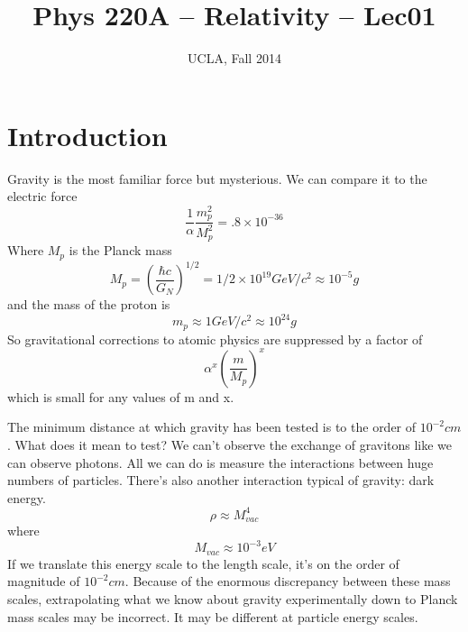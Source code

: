
\usepackage[margin=1in]{geometry} %





\title{Phys 220A -- Relativity -- Lec01}
\author{UCLA, Fall 2014}
\date{} %


\setlength{\unitlength}{1mm}
\maketitle

\section{Introduction}
Gravity is the most familiar force but mysterious. We can compare it to the electric force
\begin{equation}
\frac{1}{\alpha} \frac{m_p^2}{M_p^2} = .8 \times 10^{-36}
\end{equation}
Where $M_p$ is the Planck mass
\begin{equation}
M_p = \left(\frac{\hbar c}{G_N}\right)^{1/2} = 1/2 \times 10^19 GeV/c^2  \approx 10^{-5} g
\end{equation}
and the mass of the proton is
\begin{equation}
m_p \approx 1 GeV/c^2 \approx 10^{24} g
\end{equation}
So gravitational corrections to atomic physics are suppressed by a factor of
\begin{equation}
\alpha^x \left(\frac{m}{M_p}\right)^x
\end{equation}
which is small for any values of m and x. 

The minimum distance at which gravity has been tested is to the order
of $10^{-2} cm$. What does it mean to test? We can't observe the
exchange of gravitons like we can observe photons. All we can do is
measure the interactions between huge numbers of particles. There's
also another interaction typical of gravity: dark energy. 
\begin{equation}
\rho \approx M_{vac}^4
\end{equation}
where
\begin{equation}
M_{vac} \approx 10^{-3} eV
\end{equation}
If we translate this energy scale to the length scale, it's on the
order of magnitude of $10^{-2}cm$. Because of the enormous
discrepancy between these mass scales, extrapolating what we know about
gravity experimentally down to Planck mass scales may be incorrect. It
may be different at particle energy scales. 

